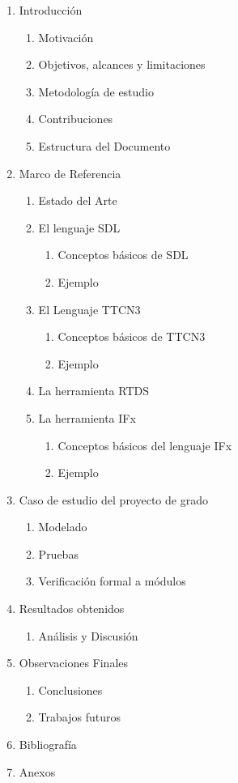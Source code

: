 \begin{enumerate}
	\item Introducci\'on
	\begin{enumerate}[{1}.1.]
		\item Motivaci\'on
		\item Objetivos, alcances y limitaciones
		\item Metodolog\'ia de estudio
		\item Contribuciones  
		\item Estructura del Documento
	\end{enumerate}
	\item Marco de Referencia
	\begin{enumerate}[{2}.1.]
		\item Estado del Arte
		\item El lenguaje SDL
		\begin{enumerate}[{2}.2.1.]
		      \item Conceptos b\'asicos de SDL 
		      \item Ejemplo
		\end{enumerate}
		\item El Lenguaje TTCN3
		\begin{enumerate}[{2}.3.1.]
		      \item Conceptos b\'asicos de TTCN3 
		      \item Ejemplo
		\end{enumerate}
		\item La herramienta RTDS
		\item La herramienta IFx
		\begin{enumerate}[{2}.5.1.]
		      \item Conceptos b\'asicos del lenguaje IFx  
		      \item Ejemplo
		\end{enumerate}
	\end{enumerate}
	\item Caso de estudio del proyecto de grado
	\begin{enumerate}[{3}.1.]
		\item Modelado 
		\item Pruebas 
		\item Verificaci\'on formal a m\'odulos 
	\end{enumerate}
	\item Resultados obtenidos
	\begin{enumerate}[{4}.1.]
		\item An\'alisis y Discusi\'on
	\end{enumerate}
	\item Observaciones Finales
	\begin{enumerate}[{5}.1.]
		\item Conclusiones
		\item Trabajos futuros
	\end{enumerate}
	\item Bibliograf\'ia
	\item Anexos
\end{enumerate}

